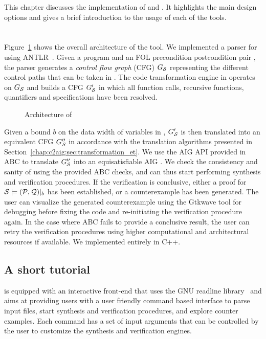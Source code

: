 This chapter discusses the implementation of \mytool{} and \biptool{}. 
It highlights the main design options and gives a brief introduction to the usage
of each of the tools.

\section{\mytool{}} \label{chap:implementation:psq}
Figure~\ref{fig:psq_architecture} shows the overall architecture of the \mytool{} tool. 
We implemented a parser for \psqlanguage{} using ANTLR~\cite{parr1995antlr}.
Given a program \Pm and an FOL precondition postcondition pair \pair{\Pre}{\Post},
the parser generates a {\em control flow graph} (CFG) $G_\mathcal{S}$  representing the different
control paths that can be taken in \Pm. The code transformation engine in \mytool{}
operates on $G_\mathcal{S}$ and builds a CFG $G'_\mathcal{S}$ in which all function calls, recursive functions, 
quantifiers and specifications have been resolved. 

\begin{figure}[tb]
\centering
\resizebox{0.8\textwidth}{!}{
 
}
\caption{Architecture of \mytool{}}
\label{fig:psq_architecture}
\end{figure}

Given a bound $b$ on the data width of variables in \Pm, $G'_\mathcal{S}$ is then translated into an equivalent
\thislanguage{} CFG $G''_\mathcal{S}$ in accordance with the translation algorithms presented in Section~\ref{chap:c2aig:sec:transformation_et}.
We use the AIG API provided in ABC to translate $G''_\mathcal{S}$ into an equisatisfiable AIG \aigcircuit.
We check the consistency and sanity of \aigcircuit{} using the provided ABC checks, and can thus start performing synthesis 
and verification procedures. If the verification is conclusive, either a proof for $\mathcal{S} \models (\mathcal{P}, \mathcal{Q})|_b$ has been
established, or a counterexample has been generated. The user can visualize the generated counterexample using the Gtkwave tool 
for debugging before fixing the code and re-initiating the verification procedure again. 
In the case where ABC fails to provide a conclusive result, the user can retry the verification procedures using higher 
computational and architectural resources if available. We implemented \mytool{} entirely in C++.

\subsection*{A short tutorial}
\mytool{} is equipped with an interactive front-end that uses the GNU readline library~\cite{fox1994gnu}
and aims at providing users with a user friendly command based interface to parse input files, start
synthesis and verification procedures, and explore counter examples. Each command has a set of input arguments
that can be controlled by the user to customize the synthesis and verification engines. 


